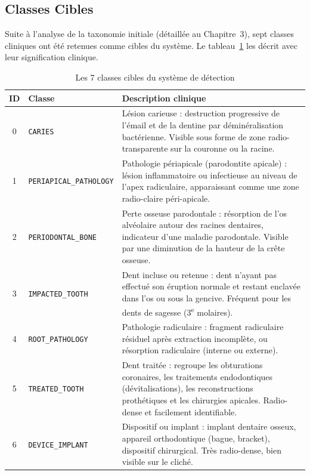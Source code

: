 \documentclass{rapportENSIAS}
\begin{document}
\subsection{Classes Cibles}

Suite à l'analyse de la taxonomie initiale (détaillée au Chapitre~3), sept classes cliniques ont été retenues comme cibles du système. Le tableau~\ref{tab:classes_cibles} les décrit avec leur signification clinique.

\begin{table}[H]
\centering
\caption{Les 7 classes cibles du système de détection}
\label{tab:classes_cibles}
\begin{tabular}{clp{8.5cm}}
\toprule
\textbf{ID} & \textbf{Classe} & \textbf{Description clinique} \\
\midrule
0 & \texttt{CARIES}
  & Lésion carieuse : destruction progressive de l'émail et de la dentine par déminéralisation bactérienne. Visible sous forme de zone radio-transparente sur la couronne ou la racine. \\
\midrule
1 & \texttt{PERIAPICAL\_PATHOLOGY}
  & Pathologie périapicale (parodontite apicale) : lésion inflammatoire ou infectieuse au niveau de l'apex radiculaire, apparaissant comme une zone radio-claire péri-apicale. \\
\midrule
2 & \texttt{PERIODONTAL\_BONE}
  & Perte osseuse parodontale : résorption de l'os alvéolaire autour des racines dentaires, indicateur d'une maladie parodontale. Visible par une diminution de la hauteur de la crête osseuse. \\
\midrule
3 & \texttt{IMPACTED\_TOOTH}
  & Dent incluse ou retenue : dent n'ayant pas effectué son éruption normale et restant enclavée dans l'os ou sous la gencive. Fréquent pour les dents de sagesse (3\textsuperscript{e} molaires). \\
\midrule
4 & \texttt{ROOT\_PATHOLOGY}
  & Pathologie radiculaire : fragment radiculaire résiduel après extraction incomplète, ou résorption radiculaire (interne ou externe). \\
\midrule
5 & \texttt{TREATED\_TOOTH}
  & Dent traitée : regroupe les obturations coronaires, les traitements endodontiques (dévitalisations), les reconstructions prothétiques et les chirurgies apicales. Radio-dense et facilement identifiable. \\
\midrule
6 & \texttt{DEVICE\_IMPLANT}
  & Dispositif ou implant : implant dentaire osseux, appareil orthodontique (bague, bracket), dispositif chirurgical. Très radio-dense, bien visible sur le cliché. \\
\bottomrule
\end{tabular}
\end{table}
\end{document}

